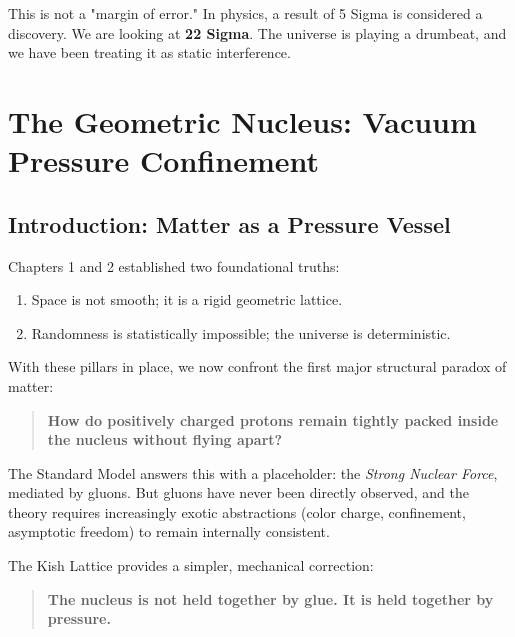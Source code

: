 \documentclass[11pt, letterpaper, openany]{book}
\begin{document}
This is not a "margin of error." In physics, a result of 5 Sigma is considered a discovery. We are looking at \textbf{22 Sigma}. The universe is playing a drumbeat, and we have been treating it as static interference.



\chapter{The Geometric Nucleus: Vacuum Pressure Confinement}
\label{ch:geometric_nucleus}

\section{Introduction: Matter as a Pressure Vessel}

Chapters 1 and 2 established two foundational truths:

\begin{enumerate}
    \item Space is not smooth; it is a rigid geometric lattice.
    \item Randomness is statistically impossible; the universe is deterministic.
\end{enumerate}

With these pillars in place, we now confront the first major structural paradox of matter:

\begin{quote}
\textbf{How do positively charged protons remain tightly packed inside the nucleus without flying apart?}
\end{quote}

The Standard Model answers this with a placeholder: the \textit{Strong Nuclear Force}, mediated by gluons.  
But gluons have never been directly observed, and the theory requires increasingly exotic abstractions (color charge, confinement, asymptotic freedom) to remain internally consistent.

The Kish Lattice provides a simpler, mechanical correction:

\begin{quote}
\textbf{The nucleus is not held together by glue.  
It is held together by pressure.}
\end{quote}
\end{document}
